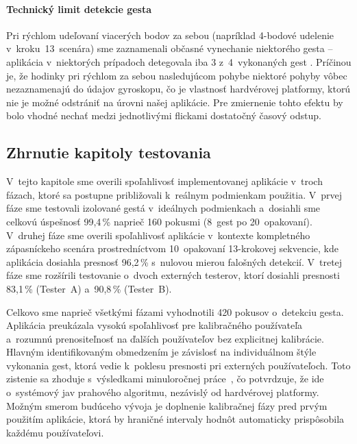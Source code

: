 \paragraph{Technický limit detekcie gesta }
Pri rýchlom udeľovaní viacerých bodov za sebou
(napríklad 4-bodové udelenie v~kroku~13~scenára)
sme zaznamenali občasné vynechanie niektorého
gesta  -- aplikácia v~niektorých prípadoch
detegovala iba 3 z~4~vykonaných gest . Príčinou
je, že hodinky pri rýchlom za sebou nasledujúcom
pohybe niektoré pohyby vôbec nezaznamenajú do
údajov gyroskopu, čo je vlastnosť hardvérovej
platformy, ktorú nie je možné odstrániť na úrovni
našej aplikácie. Pre zmiernenie tohto efektu by
bolo vhodné nechať medzi jednotlivými flickami
dostatočný časový odstup.

\subsection{Zhrnutie kapitoly testovania}

V~tejto kapitole sme overili spoľahlivosť implementovanej
aplikácie v~troch fázach, ktoré sa postupne približovali
k~reálnym podmienkam použitia. V~prvej fáze sme testovali
izolované gestá v~ideálnych podmienkach a~dosiahli sme
celkovú úspešnosť 99,4\,\% naprieč 160 pokusmi (8~gest
po 20~opakovaní). V~druhej fáze sme overili spoľahlivosť
aplikácie v~kontexte kompletného zápasníckeho scenára
prostredníctvom 10~opakovaní 13-krokovej sekvencie, kde
aplikácia dosiahla presnosť 96,2\,\% s~nulovou mierou
falošných detekcií. V~tretej fáze sme rozšírili testovanie
o~dvoch externých testerov, ktorí dosiahli presnosti
83,1\,\% (Tester~A) a~90,8\,\% (Tester~B).

Celkovo sme naprieč všetkými fázami vyhodnotili 420
pokusov o~detekciu gesta. Aplikácia preukázala vysokú
spoľahlivosť pre kalibračného používateľa a~rozumnú
prenositeľnosť na ďalších používateľov bez explicitnej
kalibrácie. Hlavným identifikovaným obmedzením je
závislosť na individuálnom štýle vykonania gest, ktorá
vedie k~poklesu presnosti pri externých používateľoch.
Toto zistenie sa zhoduje s~výsledkami minuloročnej
práce~\cite{dp-balla}, čo potvrdzuje, že ide o~systémový
jav prahového algoritmu, nezávislý od hardvérovej platformy.
Možným smerom budúceho vývoja je doplnenie kalibračnej
fázy pred prvým použitím aplikácie, ktorá by hraničné
intervaly hodnôt automaticky prispôsobila každému používateľovi.